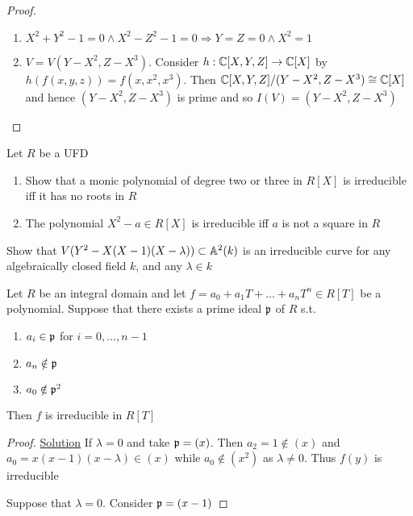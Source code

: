 \documentclass[11pt]{article}
\begin{document}
\begin{proof}
\begin{enumerate}
\item \(X^2+Y^2-1=0\wedge X^2-Z^2-1=0\Rightarrow Y=Z=0\wedge X^2=1\)
\item \(V=V(Y-X^2,Z-X^3)\). Consider \(h:\mathbb{C}[X,Y,Z]\to\mathbb{C}[X]\) by \(h(f(x,y,z))=f(x,x^2,x^3)\). Then
\(\mathbb{C}[X,Y,Z]/(Y-X^2,Z-X^3)\cong\mathbb{C}[X]\) and hence \((Y-X^2,Z-X^3)\) is prime and so \(I(V)=(Y-X^2,Z-X^3)\)
\end{enumerate}
\end{proof}

\begin{exercise}
Let \(R\) be a UFD
\begin{enumerate}
\item Show that a monic polynomial of degree two or three in \(R[X]\) is irreducible iff it has no
roots in \(R\)
\item The polynomial \(X^2-a\in R[X]\) is irreducible iff \(a\) is not a square in \(R\)
\end{enumerate}
\end{exercise}

\begin{exercise}
\label{ex1.35}
Show that \(V(Y^2-X(X-1)(X-\lambda))\subset\mathbb{A}^2(k)\) is an irreducible curve for any algebraically closed
field \(k\), and any \(\lambda\in k\)
\end{exercise}

\begin{theorem}
Let \(R\) be an integral domain and let \(f=a_0+a_1T+\dots+a_nT^n\in R[T]\) be a polynomial. Suppose
that there exists a prime ideal \(\mathfrak{p}\) of \(R\) s.t.
\begin{enumerate}
\item \(a_i\in\mathfrak{p}\) for \(i=0,\dots,n-1\)
\item \(a_n\notin\mathfrak{p}\)
\item \(a_0\notin\mathfrak{p}^2\)
\end{enumerate}


Then \(f\) is irreducible in \(R[T]\)
\end{theorem}


\begin{proof}
\href{https://math.stackexchange.com/questions/2668988/exercise-1-35-in-fultons-algebraic-curves}{Solution}
If \(\lambda=0\) and take \(\mathfrak{p}=(x)\). Then \(a_2=1\notin(x)\) and \(a_0=x(x-1)(x-\lambda)\in(x)\) while \(a_0\notin(x^2)\)
as \(\lambda\neq 0\). Thus \(f(y)\) is irreducible

Suppose that \(\lambda=0\). Consider \(\mathfrak{p}=(x-1)\)
\end{proof}
\end{document}
